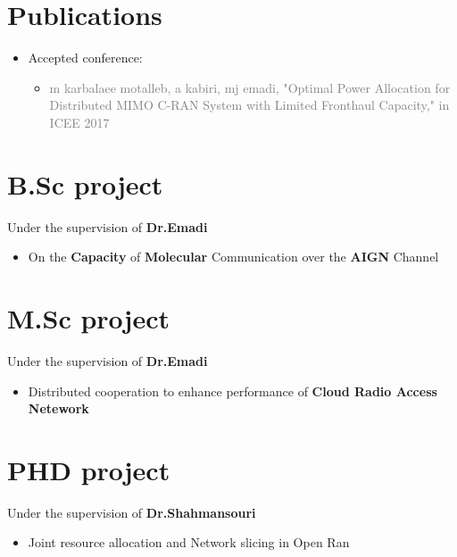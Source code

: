 \documentclass[10pt,a4paper,sans]{moderncv} %
\begin{document}
\section{Publications}
\begin{itemize}
\item
Accepted conference:
\begin{itemize}
\item
\textcolor{gray}{
m karbalaee motalleb, a kabiri, mj emadi, "Optimal Power Allocation for Distributed MIMO C-RAN System with Limited Fronthaul Capacity," in  ICEE 2017 }
\end{itemize}

\end{itemize}

\section{B.Sc project}
Under the supervision of \textbf{Dr.Emadi} 
\begin{itemize}
\item On the \textbf{Capacity} of \textbf{Molecular} Communication over the \textbf{AIGN} Channel

\end{itemize}

\section{M.Sc project}
Under the supervision of \textbf{Dr.Emadi} 
\begin{itemize}
\item Distributed cooperation to enhance performance of \textbf{Cloud Radio Access Netework}

\end{itemize}
\section{PHD project}
Under the supervision of \textbf{Dr.Shahmansouri} 
\begin{itemize}
\item Joint resource allocation and Network slicing in Open Ran

\end{itemize}
\end{document}
